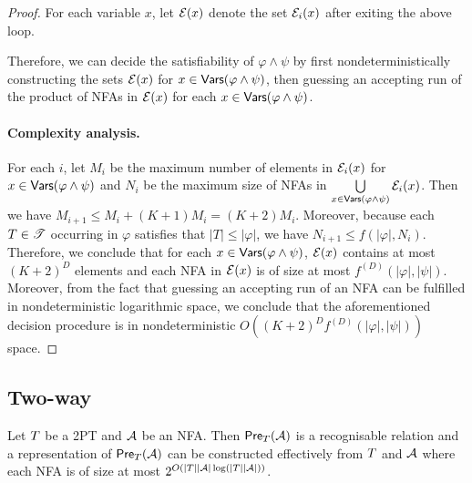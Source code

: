\begin{proof}
For each variable $x$, let $\mathcal{E}(x)$ denote the set $\mathcal{E}_i(x)$ after exiting the above loop.

Therefore, we can decide the satisfiability of $\varphi \wedge \psi$ by first nondeterministically constructing the sets $\mathcal{E}(x)$ for $x \in \mathsf{Vars}(\varphi \wedge \psi)$, then guessing an accepting run of the product of NFAs in $\mathcal{E}(x)$ for each $x \in \mathsf{Vars}(\varphi \wedge \psi)$.

\paragraph{Complexity analysis.} For each $i$, let $M_i$ be the maximum number of elements in $\mathcal{E}_i(x)$ for $x  \in \mathsf{Vars}(\varphi \wedge \psi)$ and $N_i$ be the maximum size of NFAs in $\bigcup \limits_{x \in \mathsf{Vars}(\varphi \wedge \psi)} \mathcal{E}_i(x)$. Then we have $M_{i+1} \le M_i + (K+1)M_i = (K+2) M_i$. Moreover,  because each $T \in \mathscr{T}$ occurring in $\varphi$ satisfies that $|T| \le |\varphi|$, we have $N_{i+1} \le f(|\varphi|, N_i)$. Therefore, we conclude that for each $x \in \mathsf{Vars}(\varphi \wedge \psi)$, $\mathcal{E}(x)$ contains at most $(K+2)^D$ elements and each NFA in $\mathcal{E}(x)$ is of size at most $f^{(D)}(|\varphi|, |\psi|)$. Moreover, from the fact that guessing an accepting run of an NFA can be fulfilled in nondeterministic logarithmic space, we conclude that the aforementioned decision procedure is in nondeterministic $O((K+2)^D f^{(D)}(|\varphi|, |\psi|))$ space.
\end{proof}

\subsection{Two-way}



\begin{lemma}\label{lem-2pt}
Let $T$ be a 2PT and $\mathcal{A}$ be an NFA. Then $\textsf{Pre}_{T}(\mathcal{A})$ is a recognisable relation and a representation of $\textsf{Pre}_{T}(\mathcal{A})$ can be constructed effectively from $T$ and $\mathcal{A}$ where each NFA is of size at most $2^{O(|T||\mathcal{A}|\log (|T||\mathcal{A}|))}$.
\end{lemma}

